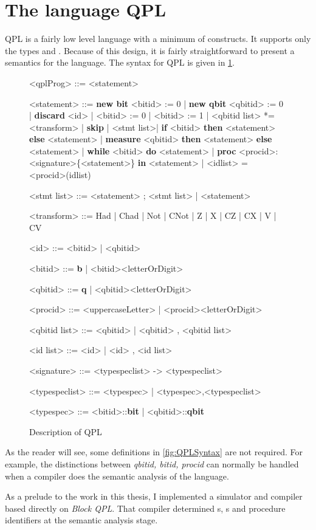 \section{The language QPL}\label{subsec:theLanguageQPL}
QPL is a fairly low level language with a  minimum of constructs. It
 supports only the types
  \bit{} and \qbit{}. Because of this 
design, it is fairly straightforward to present a semantics for the 
language. The syntax for QPL is given in \ref{fig:QPLSyntax}.
\begin{figure}[htbp]
\begin{bnf}
<qplProg>   ::= <statement>

<statement> ::= \textbf{new bit} <bitid> := 0 | \textbf{new qbit} <qbitid> := 0 |
                \textbf{discard} <id> | <bitid> := 0 | <bitid> := 1 |
                <qbitid list> *= <transform> | \textbf{skip} |
                <stmt list>|
                \textbf{if} <bitid> \textbf{then} <statement> \textbf{else} <statement> |
                \textbf{measure} <qbitid> \textbf{then} <statement> \textbf{else} <statement> |
                \textbf{while} <bitid> \textbf{do} <statement> |
                \textbf{proc} <procid>:<signature>\{<statement>\} \textbf{in} <statement> |
                <idlist> = <procid>(idlist)

<stmt list> ::= <statement> ; <stmt list> | <statement>

<transform> ::= Had | Chad | Not | CNot | Z | X | CZ | CX | V | CV

<id>        ::= <bitid> | <qbitid>

<bitid>     ::= \textbf{b} | <bitid><letterOrDigit>

<qbitid>    ::= \textbf{q} | <qbitid><letterOrDigit>

<procid>    ::= <uppercaseLetter> |
                <procid><letterOrDigit>

<qbitid list>
            ::= <qbitid> | <qbitid> , <qbitid list>

<id list>   ::= <id> | <id> , <id list>

<signature> ::= <typespeclist> -> <typespeclist>

<typespeclist>
            ::= <typespec> | <typespec>,<typespeclist>

<typespec>  ::= <bitid>::\textbf{bit} |
                <qbitid>::\textbf{qbit} 
\end{bnf}
\caption{Description of QPL}\label{fig:QPLSyntax}
\end{figure}

As the reader will see, some definitions in \vref{fig:QPLSyntax} are 
not required. For example, the distinctions between \emph{qbitid, bitid, procid} 
can normally be handled when a compiler does
 the semantic analysis of the language. 

As a prelude to the work in this thesis, I implemented a simulator
and compiler based directly on \emph{Block QPL}. 
That compiler 
determined \bit{}s, \qbit{}s and procedure identifiers at the semantic
analysis stage.

